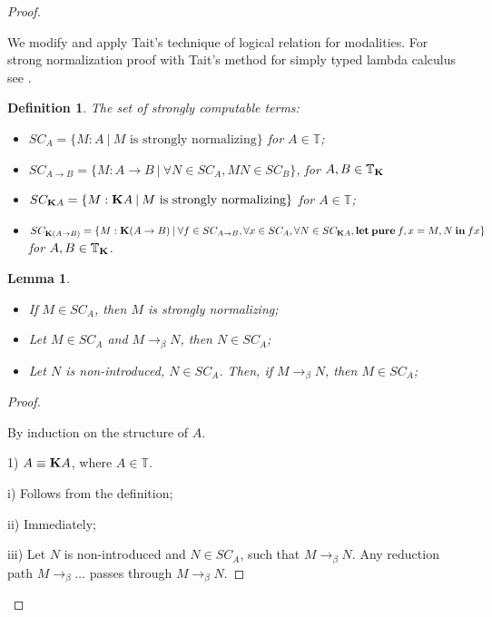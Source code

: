 \documentclass[a4paper]{article}
\newtheorem{lemma}{Lemma}
\newtheorem{defin}{Definition}
\begin{document}
\begin{proof}
  $ $

We modify and apply Tait's technique of logical relation for modalities.
For strong normalization proof with Tait's method for simply typed lambda calculus see \cite{Pierce}.

\begin{defin} The set of strongly computable terms:
  \begin{itemize}
    \item $SC_A = \{ M : A \: | \: M \text{ is strongly normalizing} \}$ for $A \in \mathbb{T}$;
    \item $SC_{A \to B} = \{ M : A \to B \: | \: \forall N \in SC_A, M N \in SC_B \}$, for $A,B \in \mathbb{T}_{\bf K}$
    \item $SC_{{\bf K}A} = \{ M : {\bf K}A \: | \: M \text{ is strongly normalizing} \}$ for $A \in \mathbb{T}$;
    \item $SC_{{\bf K}(A \to B)} = \{ M : {\bf K}(A \to B) \: | \: \forall f \in SC_{A \to B}, \forall x \in SC_A, \forall N \in SC_{{\bf K}A}, {\bf let \: pure \:} f, x = M, N {\: \bf in \:} f x \}$ for $A,B \in \mathbb{T}_{\bf K}$.
  \end{itemize}
\end{defin}

\begin{lemma}
  $ $

\begin{itemize}
\item If $M \in SC_A$, then $M$ is strongly normalizing;
\item Let $M \in SC_A$ and $M \rightarrow_{\beta} N$, then $N \in SC_A$;
\item Let $N$ is non-introduced, $N \in SC_A$. Then, if $M \rightarrow_{\beta} N$, then $M \in SC_A$;
\end{itemize}
\end{lemma}

\begin{proof}
  $ $

  By induction on the structure of $A$.

  1) $A \equiv {\bf K}A$, where $A \in \mathbb{T}$.

  i) Follows from the definition;

  ii) Immediately;

  iii) Let $N$ is non-introduced and $N \in SC_A$, such that $M \rightarrow_{\beta} N$.
  Any reduction path $M \rightarrow_{\beta} \dots$ passes through $M \rightarrow_{\beta} N$.


\end{proof}
\end{proof}
\end{document}

